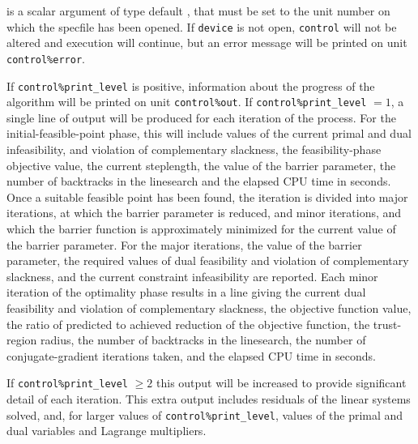 \documentclass{galahad}
\begin{document}
\begin{description}

 is a scalar \intentin argument of type default \integer,
that must be set to the unit number on which the specfile
has been opened. If {\tt device} is not open, {\tt control} will
not be altered and execution will continue, but an error message
will be printed on unit {\tt control\%error}.

\end{description}


\galinfo
If {\tt control\%print\_level} is positive, information about the progress 
of the algorithm will be printed on unit {\tt control\-\%out}.
If {\tt control\%print\_level} $= 1$, a single line of output will be produced 
for each iteration of the process. 
For the initial-feasible-point phase,
this will include values of the current primal and dual infeasibility, and
violation of complementary slackness, the feasibility-phase objective value,
the current steplength, the value of the barrier parameter, the
number of backtracks in the linesearch and the elapsed CPU time in seconds.
Once a suitable feasible point has been found, the iteration is divided
into major iterations, at which the barrier parameter is reduced, and
minor iterations, and which the barrier function is approximately minimized
for the current value of the barrier parameter. For the major iterations,
the value of the barrier parameter, the required values of 
dual feasibility and violation of complementary slackness, and the current
constraint infeasibility are reported. Each minor iteration of the
optimality phase results in a line giving 
the current dual feasibility and violation of complementary slackness, the
objective function value, the ratio of predicted to achieved reduction 
of the objective function, the trust-region radius, the 
number of backtracks in the linesearch, the number of conjugate-gradient 
iterations taken, and the elapsed CPU time in seconds. 

If {\tt control\%print\_level} $\geq 2$ this 
output will be increased to provide significant detail of each iteration. 
This extra output includes residuals of the linear systems solved, and,
for larger values of {\tt control\%print\_level}, values of the primal and dual
variables and Lagrange multipliers. 

\end{document}
